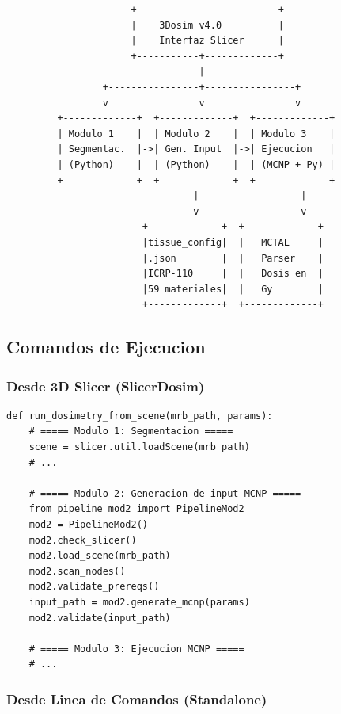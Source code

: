 \documentclass[12pt,a4paper]{article}
\begin{document}
\begin{verbatim}
                      +-------------------------+
                      |    3Dosim v4.0          |
                      |    Interfaz Slicer      |
                      +-----------+-------------+
                                  |
                 +----------------+----------------+
                 v                v                v
         +-------------+  +-------------+  +-------------+
         | Modulo 1    |  | Modulo 2    |  | Modulo 3    |
         | Segmentac.  |->| Gen. Input  |->| Ejecucion   |
         | (Python)    |  | (Python)    |  | (MCNP + Py) |
         +-------------+  +-------------+  +-------------+
                                 |                  |
                                 v                  v
                        +-------------+  +-------------+
                        |tissue_config|  |   MCTAL     |
                        |.json        |  |   Parser    |
                        |ICRP-110     |  |   Dosis en  |
                        |59 materiales|  |   Gy        |
                        +-------------+  +-------------+
\end{verbatim}

\subsection{Comandos de Ejecucion}

\subsubsection{Desde 3D Slicer (SlicerDosim)}

\begin{verbatim}
def run_dosimetry_from_scene(mrb_path, params):
    # ===== Modulo 1: Segmentacion =====
    scene = slicer.util.loadScene(mrb_path)
    # ...

    # ===== Modulo 2: Generacion de input MCNP =====
    from pipeline_mod2 import PipelineMod2
    mod2 = PipelineMod2()
    mod2.check_slicer()
    mod2.load_scene(mrb_path)
    mod2.scan_nodes()
    mod2.validate_prereqs()
    input_path = mod2.generate_mcnp(params)
    mod2.validate(input_path)

    # ===== Modulo 3: Ejecucion MCNP =====
    # ...
\end{verbatim}

\subsubsection{Desde Linea de Comandos (Standalone)}
\end{document}

